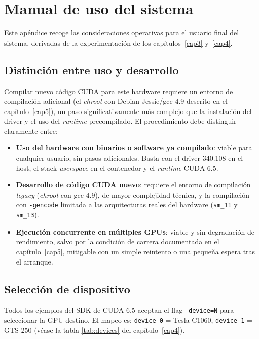 \chapter{Manual de uso del sistema} \label{ape:manual-uso}

Este apéndice recoge las consideraciones operativas para el usuario final del sistema, derivadas de la experimentación de los capítulos~\ref{cap3} y~\ref{cap4}.

\section{Distinción entre uso y desarrollo}

Compilar nuevo código CUDA para este hardware requiere un entorno de compilación adicional (el \textit{chroot} con Debian Jessie/gcc 4.9 descrito en el capítulo~\ref{cap5}), un paso significativamente más complejo que la instalación del driver y el uso del \textit{runtime} precompilado. El procedimiento debe distinguir claramente entre:

\begin{itemize}
    \item \textbf{Uso del hardware con binarios o software ya compilado}: viable para cualquier usuario, sin pasos adicionales. Basta con el driver 340.108 en el host, el stack \textit{userspace} en el contenedor y el \textit{runtime} CUDA 6.5.

    \item \textbf{Desarrollo de código CUDA nuevo}: requiere el entorno de compilación \textit{legacy} (\textit{chroot} con gcc 4.9), de mayor complejidad técnica, y la compilación con \texttt{-gencode} limitada a las arquitecturas reales del hardware (\texttt{sm\_11} y \texttt{sm\_13}).

    \item \textbf{Ejecución concurrente en múltiples GPUs}: viable y sin degradación de rendimiento, salvo por la condición de carrera documentada en el capítulo~\ref{cap5}, mitigable con un simple reintento o una pequeña espera tras el arranque.
\end{itemize}

\section{Selección de dispositivo}

Todos los ejemplos del SDK de CUDA 6.5 aceptan el flag \texttt{--device=N} para seleccionar la GPU destino. El mapeo es: \texttt{device 0} = Tesla C1060, \texttt{device 1} = GTS 250 (véase la tabla \ref{tab:devices} del capítulo~\ref{cap4}).


